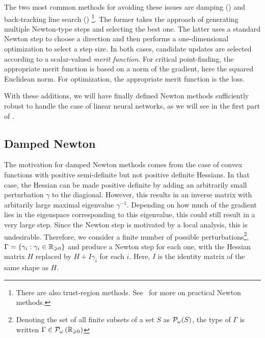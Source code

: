 \documentclass[../../thesis.tex]{subfiles}
\begin{document}
The two most common methods for avoiding
these issues are damping ()
and back-tracking line search ()%
\footnote{%
There are also trust-region methods.
See~\cite[Chapter 6 and Section 11.2]{nocedal2006}
for more on practical Newton methods.
}.
The former takes the approach of generating
multiple Newton-type steps and selecting
the best one.
The latter uses a standard Newton step
to choose a direction and then performs
a one-dimensional optimization
to select a step size.
In both cases, candidate updates are selected
according to a scalar-valued \emph{merit function}.
For critical point-finding,
the appropriate merit function is based on a norm of the gradient,
here the squared Euclidean norm.
For optimization, the appropriate merit function
is the loss.

With these additions,
we will have finally defined Newton methods
sufficiently robust to handle the case of
linear neural networks, as we will see in the first part of
.


\subsection{Damped Newton}

The motivation for damped Newton methods
comes from the case of convex functions
with positive semi-definite but not positive definite Hessians.
In that case,
the Hessian can be made positive definite
by adding an arbitrarily small
perturbation $\gamma$ to the diagional.
However, this results in an inverse matrix
with arbitarily large maximal eigenvalue $\gamma^{-1}$.
Depending on how much of the gradient lies in the eigenspace
corresponding to this eigenvalue,
this could still result in
a very large step.
Since the Newton step is motivated by a local analysis,
this is undesirable.
Therefore,
we consider a finite number of possible perturbations\footnote{%
Denoting the set of all finite subsets of a set $S$ as
${\mathcal{P}}_\omega(S)$, the type of $\Gamma$ is written
$\Gamma \in {\mathcal{P}}_\omega\left(\mathbb{R}_{\geqslant 0}\right)$},
$\Gamma = \left\{\gamma_i : \gamma_i \in \mathbb{R}_{\geqslant 0}\right\}$
and produce a Newton step for each one,
with the Hessian matrix $H$ replaced by
$H + I\gamma_i$ for each $i$.
Here, $I$ is the identity matrix of
the same shape as $H$.
\end{document}
